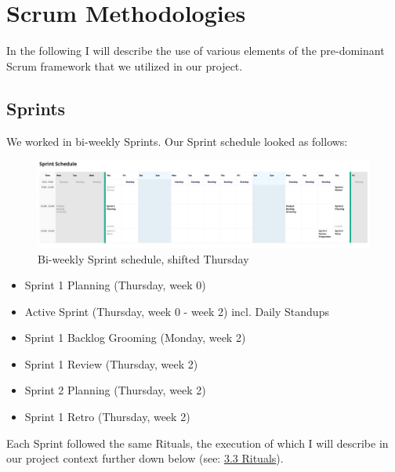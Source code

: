 \documentclass[a4paper]{article}
\begin{document}
\section{Scrum Methodologies}
In the following I will describe the use of various elements of the pre-dominant Scrum framework that we utilized in our project.
\subsection{Sprints}
\label{sec:sprints}
We worked in bi-weekly Sprints. Our Sprint schedule looked as follows:
\begin{figure}[h]
    \centering
    \includegraphics[width=1\textwidth \centering]{sprintschedule.jpeg}
    \caption{Bi-weekly Sprint schedule, shifted Thursday}
    \label{fig:schedule}
\end{figure}
\begin{itemize}
    \item Sprint 1 Planning (Thursday, week 0)
    \item Active Sprint (Thursday, week 0 - week 2) incl. Daily Standups
    \item Sprint 1 Backlog Grooming (Monday, week 2)
    \item Sprint 1 Review (Thursday, week 2)
    \item Sprint 2 Planning  (Thursday, week 2)
    \item Sprint 1 Retro (Thursday, week 2)
\end{itemize}
Each Sprint followed the same Rituals, the execution of which I will describe in our project context further down below (see: \hyperref[sec:rituals]{3.3 Rituals}).
\end{document}
